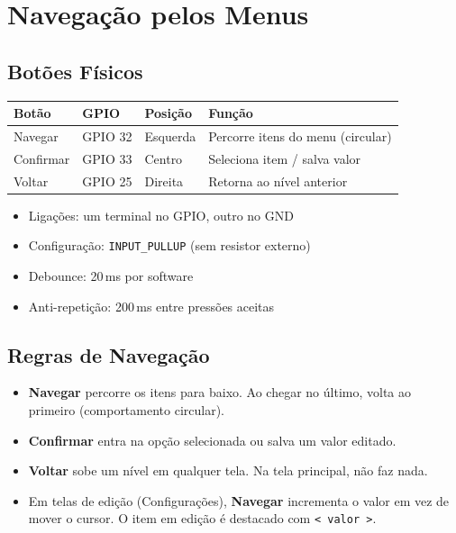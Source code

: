 \documentclass[12pt,a4paper]{article}
\begin{document}
\section{Navegação pelos Menus}

\subsection{Botões Físicos}

\begin{tabularx}{\textwidth}{l l l X}
\toprule
\textbf{Botão} & \textbf{GPIO} & \textbf{Posição} & \textbf{Função} \\
\midrule
Navegar & GPIO 32 & Esquerda & Percorre itens do menu (circular) \\
Confirmar & GPIO 33 & Centro & Seleciona item / salva valor \\
Voltar & GPIO 25 & Direita & Retorna ao nível anterior \\
\bottomrule
\end{tabularx}

\begin{itemize}[nosep]
  \item Ligações: um terminal no GPIO, outro no GND
  \item Configuração: \texttt{INPUT\_PULLUP} (sem resistor externo)
  \item Debounce: 20\,ms por software
  \item Anti-repetição: 200\,ms entre pressões aceitas
\end{itemize}

\subsection{Regras de Navegação}

\begin{itemize}[nosep]
  \item \textbf{Navegar} percorre os itens para baixo. Ao chegar no último, volta ao primeiro (comportamento circular).
  \item \textbf{Confirmar} entra na opção selecionada ou salva um valor editado.
  \item \textbf{Voltar} sobe um nível em qualquer tela. Na tela principal, não faz nada.
  \item Em telas de edição (Configurações), \textbf{Navegar} incrementa o valor em vez de mover o cursor. O item em edição é destacado com \texttt{< valor >}.
\end{itemize}
\end{document}
